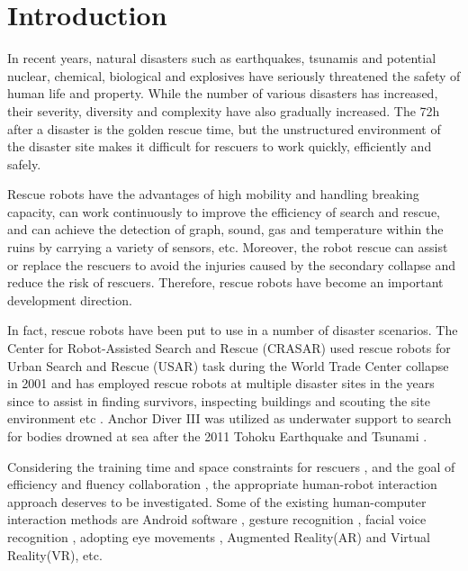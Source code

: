 \chapter{Introduction}

In recent years, natural disasters such as earthquakes, tsunamis and potential nuclear, chemical, biological and explosives have seriously threatened the safety of human life and property. While the number of various disasters has increased, their severity, diversity and complexity have also gradually increased. The 72h after a disaster is the golden rescue time, but the unstructured environment of the disaster site makes it difficult for rescuers to work quickly, efficiently and safely.

Rescue robots have the advantages of high mobility and handling breaking capacity, can work continuously to improve the efficiency of search and rescue, and can achieve the detection of graph, sound, gas and temperature within the ruins by carrying a variety of sensors, etc.
Moreover, the robot rescue can assist or replace the rescuers to avoid the injuries caused by the secondary collapse and reduce the risk of rescuers. Therefore, rescue robots have become an important development direction.

In fact, rescue robots have been put to use in a number of disaster scenarios. The Center for Robot-Assisted Search and Rescue (CRASAR) used rescue robots for Urban Search and Rescue (USAR) task during the World Trade Center collapse in 2001 \cite{Casper:2003tk} and has employed rescue robots at multiple disaster sites in the years since to assist in finding survivors, inspecting buildings and scouting the site environment etc \cite{Murphy:2012th}. Anchor Diver III was utilized as underwater support to search for bodies drowned at sea after the 2011 Tohoku Earthquake and Tsunami \cite{Huang:2011wq}.

Considering the training time and space constraints for rescuers \cite{Murphy:2004wl}, and the goal of eﬃciency and ﬂuency collaboration \cite{10.1145/1228716.1228718}, the appropriate human-robot interaction approach deserves to be investigated. Some of the existing human-computer interaction methods are Android software \cite{Sarkar:2017tt} \cite{Faisal:2019uu}, gesture recognition\cite{Sousa:2017tn} \cite{10.1145/2157689.2157818} \cite{Nagi:2014vu}, facial voice recognition \cite{Pourmehr:2013ta}, adopting eye movements \cite{Ma:2015wu}, Augmented Reality(AR)\cite{SOARES20151656} and Virtual Reality(VR), etc.

